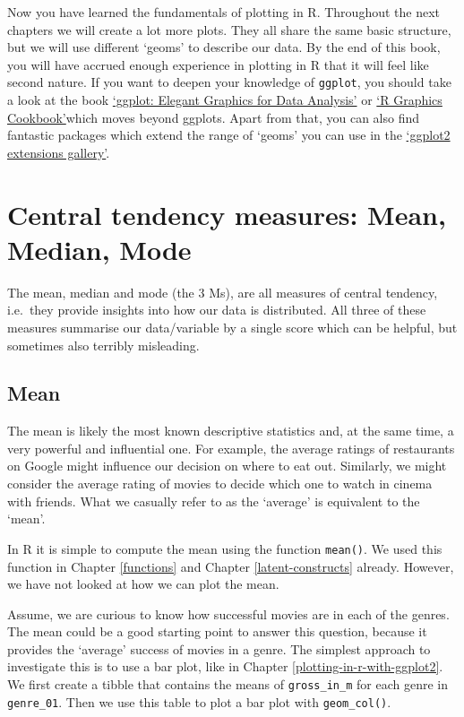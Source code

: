 \documentclass[
]{book}
\begin{document}
Now you have learned the fundamentals of plotting in R. Throughout the next chapters we will create a lot more plots. They all share the same basic structure, but we will use different `geoms' to describe our data. By the end of this book, you will have accrued enough experience in plotting in R that it will feel like second nature. If you want to deepen your knowledge of \texttt{ggplot}, you should take a look at the book \href{https://ggplot2-book.org}{`ggplot: Elegant Graphics for Data Analysis'} or \href{https://r-graphics.org}{`R Graphics Cookbook'}which moves beyond ggplots. Apart from that, you can also find fantastic packages which extend the range of `geoms' you can use in the \href{https://exts.ggplot2.tidyverse.org/gallery/}{`ggplot2 extensions gallery'}.

\hypertarget{central-tendency}{%
\section{Central tendency measures: Mean, Median, Mode}\label{central-tendency}}

The mean, median and mode (the 3 Ms), are all measures of central tendency, i.e.~they provide insights into how our data is distributed. All three of these measures summarise our data/variable by a single score which can be helpful, but sometimes also terribly misleading.

\hypertarget{mean}{%
\subsection{Mean}\label{mean}}

The mean is likely the most known descriptive statistics and, at the same time, a very powerful and influential one. For example, the average ratings of restaurants on Google might influence our decision on where to eat out. Similarly, we might consider the average rating of movies to decide which one to watch in cinema with friends. What we casually refer to as the `average' is equivalent to the `mean'.

In R it is simple to compute the mean using the function \texttt{mean()}. We used this function in Chapter \ref{functions} and Chapter \ref{latent-constructs} already. However, we have not looked at how we can plot the mean.

Assume, we are curious to know how successful movies are in each of the genres. The mean could be a good starting point to answer this question, because it provides the `average' success of movies in a genre. The simplest approach to investigate this is to use a bar plot, like in Chapter \ref{plotting-in-r-with-ggplot2}. We first create a tibble that contains the means of \texttt{gross\_in\_m} for each genre in \texttt{genre\_01}. Then we use this table to plot a bar plot with \texttt{geom\_col()}.
\end{document}
